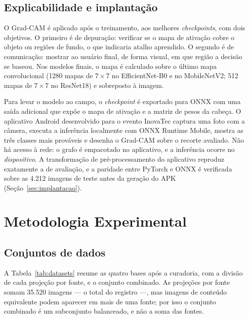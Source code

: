 \documentclass[11pt,a4paper]{article}
\begin{document}
	\subsection{Explicabilidade e implantação}
	
	O Grad-CAM é aplicado após o treinamento, aos melhores \emph{checkpoints}, com dois objetivos. O primeiro é de depuração: verificar se o mapa de ativação cobre o objeto ou regiões de fundo, o que indicaria atalho aprendido. O segundo é de comunicação: mostrar ao usuário final, de forma visual, em que região a decisão se baseou. Nos modelos finais, o mapa é calculado sobre o último mapa convolucional (1280 mapas de $7\times7$ no EfficientNet-B0 e no MobileNetV2; 512 mapas de $7\times7$ no ResNet18) e sobreposto à imagem.
	
	Para levar o modelo ao campo, o \emph{checkpoint} é exportado para ONNX com uma saída adicional que expõe o mapa de ativação e a matriz de pesos da cabeça. O aplicativo Android desenvolvido para o evento InovaTec captura uma foto com a câmera, executa a inferência localmente com ONNX Runtime Mobile, mostra as três classes mais prováveis e desenha o Grad-CAM sobre o recorte avaliado. Não há acesso à rede: o grafo é empacotado no aplicativo, e a inferência ocorre no \textit{dispositivo}. A transformação de pré-processamento do aplicativo reproduz exatamente a de avaliação, e a paridade entre PyTorch e ONNX é verificada sobre as 4.212 imagens de teste antes da geração do APK (Seção~\ref{sec:implantacao}).
	
	\section{Metodologia Experimental}
	\label{sec:metodologia}
	
	\subsection{Conjuntos de dados}
	
	A Tabela~\ref{tab:datasets} resume as quatro bases após a curadoria, com a divisão de cada projeção por fonte, e o conjunto combinado. As projeções por fonte somam 35.520 imagens --- o total do registro ---, mas imagens de conteúdo equivalente podem aparecer em mais de uma fonte; por isso o conjunto combinado é um subconjunto balanceado, e não a soma das fontes.
	
\end{document}
